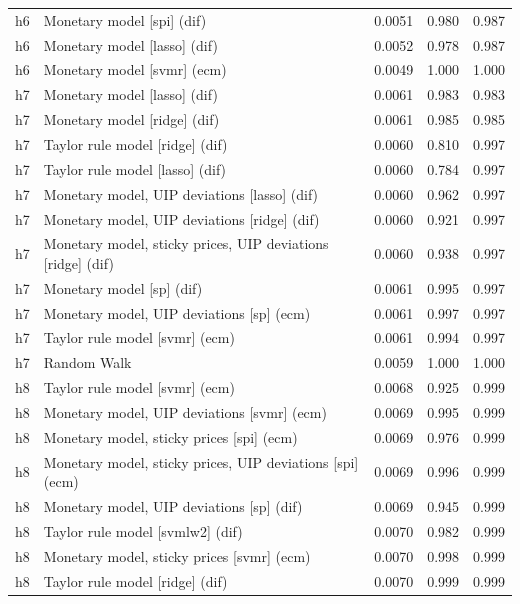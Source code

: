 \begin{ThreePartTable}
\begin{longtable}[t]{cp{5.5cm}ccc}
h6 & \raggedright Monetary model [spi] (dif) & 0.0051 & 0.980 & 0.987\\
h6 & \raggedright Monetary model [lasso] (dif) & 0.0052 & 0.978 & 0.987\\
h6 & \raggedright Monetary model [svmr] (ecm) & 0.0049 & 1.000 & 1.000\\
\addlinespace
h7 & \raggedright Monetary model [lasso] (dif) & 0.0061 & 0.983 & 0.983\\
h7 & \raggedright Monetary model [ridge] (dif) & 0.0061 & 0.985 & 0.985\\
h7 & \raggedright Taylor rule model [ridge] (dif) & 0.0060 & 0.810 & 0.997\\
h7 & \raggedright Taylor rule model [lasso] (dif) & 0.0060 & 0.784 & 0.997\\
h7 & \raggedright Monetary model, UIP deviations [lasso] (dif) & 0.0060 & 0.962 & 0.997\\
h7 & \raggedright Monetary model, UIP deviations [ridge] (dif) & 0.0060 & 0.921 & 0.997\\
h7 & \raggedright Monetary model, sticky prices, UIP deviations [ridge] (dif) & 0.0060 & 0.938 & 0.997\\
h7 & \raggedright Monetary model [sp] (dif) & 0.0061 & 0.995 & 0.997\\
h7 & \raggedright Monetary model, UIP deviations [sp] (ecm) & 0.0061 & 0.997 & 0.997\\
h7 & \raggedright Taylor rule model [svmr] (ecm) & 0.0061 & 0.994 & 0.997\\
h7 & \raggedright Random Walk & 0.0059 & 1.000 & 1.000\\
\addlinespace
h8 & \raggedright Taylor rule model [svmr] (ecm) & 0.0068 & 0.925 & 0.999\\
h8 & \raggedright Monetary model, UIP deviations [svmr] (ecm) & 0.0069 & 0.995 & 0.999\\
h8 & \raggedright Monetary model, sticky prices [spi] (ecm) & 0.0069 & 0.976 & 0.999\\
h8 & \raggedright Monetary model, sticky prices, UIP deviations [spi] (ecm) & 0.0069 & 0.996 & 0.999\\
h8 & \raggedright Monetary model, UIP deviations [sp] (dif) & 0.0069 & 0.945 & 0.999\\
h8 & \raggedright Taylor rule model [svmlw2] (dif) & 0.0070 & 0.982 & 0.999\\
h8 & \raggedright Monetary model, sticky prices [svmr] (ecm) & 0.0070 & 0.998 & 0.999\\
h8 & \raggedright Taylor rule model [ridge] (dif) & 0.0070 & 0.999 & 0.999\\

\end{longtable}
\end{ThreePartTable}
